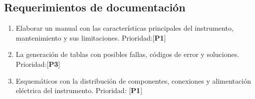 \subsection{Requerimientos de documentación}
\begin{enumerate}[label=\alph*)]
	\item Elaborar un manual con las características principales del instrumento, mantenimiento y sus limitaciones. Prioridad:[\textbf{P1}]
	\item La generación de tablas con posibles fallas, códigos de error y soluciones. Prioridad:[\textbf{P3}]
	\item Esquemáticos con la distribución de componentes, conexiones y alimentación eléctrica del instrumento. Prioridad: [\textbf{P1}]
\end{enumerate}
